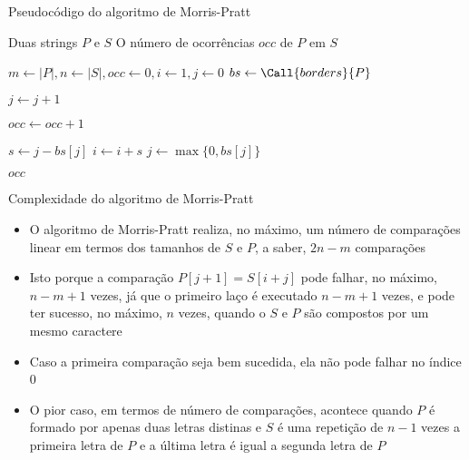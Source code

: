 \begin{frame}[fragile]{Pseudocódigo do algoritmo de Morris-Pratt}

    \begin{algorithm}[H]
        \caption{Algoritmo de Morris-Pratt}
        \begin{algorithmic}[1]
            \Require Duas strings $P$ e $S$
            \Ensure O número de ocorrências $occ$ de $P$ em $S$

                \State $m \gets |P|, n \gets |S|, occ \gets 0, i \gets 1, j \gets 0$
                \State $bs \gets \Call{borders}{P}$

                        \State $j \gets j + 1$
                    \EndWhile

                        \State $occ \gets occ + 1$
                    \EndIf

                    \State $s \gets j - bs[j]$
                    \State $i \gets i + s$
                    \State $j \gets \max\lbrace 0, bs[j]\rbrace$
                \EndWhile

                \State \Return $occ$
            \EndFunction
        \end{algorithmic}
    \end{algorithm}

\end{frame}



\begin{frame}[fragile]{Complexidade do algoritmo de Morris-Pratt}

    \begin{itemize}
        \item O algoritmo de Morris-Pratt realiza, no máximo, um número de comparações linear em 
            termos dos tamanhos de $S$ e $P$, a saber, $2n - m$ comparações

        \item Isto porque a comparação $P[j + 1] = S[i + j]$ pode falhar, no máximo, 
            $n - m + 1$ vezes, já que o primeiro laço é executado $n - m + 1$ vezes, e pode ter 
            sucesso, no máximo, $n$ vezes, quando o $S$ e $P$ são compostos por um mesmo
            caractere

        \item Caso a primeira comparação seja bem sucedida, ela não pode falhar no índice 0

        \item O pior caso, em termos de número de comparações, acontece quando $P$ é formado
            por  apenas duas letras distinas e $S$ é uma repetição de $n - 1$ vezes a primeira 
            letra de $P$ e a última letra é igual a segunda letra de $P$
    \end{itemize}

\end{frame}

